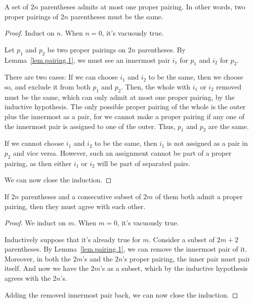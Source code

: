 \begin{lem}
A set of $2n$ parentheses admits at most one proper pairing. In other words,
two proper pairings of $2n$ parentheses must be the same.
\end{lem}
\begin{proof}
Induct on $n$. When $n=0$, it's vacuously true.

Let $p_1$ and $p_2$ be two proper pairings on $2n$ parentheses. By
Lemma~\ref{lem.pairing.1}, we must see an innermost pair $i_1$ for $p_1$ and
$i_2$ for $p_2$. 

There are two cases: If we can choose $i_1$ and $i_2$ to be the same, then we
choose so, and exclude it from both $p_1$ and $p_2$. Then,
the whole with $i_1$ or $i_2$ removed must be the same, which can only admit at
most one proper pairing, by the inductive hypothesis. The only possible proper
pairing of the whole is the outer plus the innermost as a pair, for we cannot
make a proper pairing if any one of the innermost pair is assigned to one of
the outer. Thus, $p_1$ and $p_2$ are the same.

If we cannot choose $i_1$ and $i_2$ to be the same, then $i_1$ is not assigned
as a pair in $p_2$ and vice versa. However, such an assignment cannot be part
of a proper pairing, as then either $i_1$ or $i_2$ will be part of separated
pairs.

We can now close the induction.
\end{proof}

\begin{lem}
If $2n$ parentheses and a consecutive subset of $2m$ of them both admit a
proper pairing, then they must agree with each other. 
\end{lem}
\begin{proof}
We induct on $m$. When $m=0$, it's vacuously true.

Inductively suppose that it's already true for $m$. Consider a subset of $2m+2$
parentheses. By Lemma~\ref{lem.pairing.1}, we can remove the innermost pair of
it. Moreover, in both the $2m$'s and the $2n$'s proper pairing, the inner pair
must pair itself. And now we have the $2m$'s as a subset, which by the
inductive hypothesis agrees with the $2n$'s. 

Adding the removed innermost pair back, we can now close the induction.
\end{proof}
